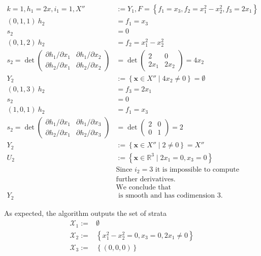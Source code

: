 \documentclass[
]{book}
\theoremstyle{definition}
\theoremstyle{definition}
\theoremstyle{definition}
\theoremstyle{definition}
\theoremstyle{remark}
\begin{document}
\begin{align}
k=1,h_{1}=2x,i_{1}=1,X''&:=Y_{1},F=\left\{ f_{1}=x_{3},f_{2}=x_{1}^{2}-x_{2}^{2},f_{3}=2x_{1}\right\} \\\left(0,1,1\right)\ h_{2}&=f_{1}=x_{3}\\s_{2}&=0\\\left(0,1,2\right)\ h_{2}&=f_{2}=x_{1}^{2}-x_{2}^{2}\\s_{2}=\det\begin{pmatrix}\partial h_{1}/\partial x_{1} & \partial h_{1}/\partial x_{2}\\
\partial h_{2}/\partial x_{1} & \partial h_{2}/\partial x_{2}
\end{pmatrix}&=\det\begin{pmatrix}2 & 0\\
2x_{1} & 2x_{2}
\end{pmatrix}=4x_{2}\\Y_{2}&:=\left\{ \mathbf{x}\in X''\mid4x_{2}\ne0\right\} =\emptyset\\\left(0,1,3\right)\ h_{2}&=f_{3}=2x_{1}\\s_{2}&=0\\\left(1,0,1\right)\ h_{2}&=f_{1}=x_{3}\\s_{2}=\det\begin{pmatrix}\partial h_{1}/\partial x_{1} & \partial h_{1}/\partial x_{3}\\
\partial h_{2}/\partial x_{1} & \partial h_{2}/\partial x_{3}
\end{pmatrix}&=\det\begin{pmatrix}2 & 0\\
0 & 1
\end{pmatrix}=2\\Y_{2}&:=\left\{ \mathbf{x}\in X''\mid2\ne0\right\} =X''\\U_{2}&:=\left\{ \mathbf{x}\in\mathbb{R}^{3}\mid2x_{1}=0,x_{3}=0\right\} \\&\text{Since }i_{2}=3\text{ it is impossible to compute}\\ & \text{further derivatives.}\\&\text{We conclude that}\\Y_{2}&\text{ is smooth and has codimension }3.
\end{align}

As expected, the algorithm outputs the set of strata
\begin{align*}
\mathcal{X}_{1}:=&\emptyset\\\mathcal{X}_{2}:=&\left\{ x_{1}^{2} - x_{2}^{2}=0,x_{3}=0,2x_{1}\ne0\right\} \\\mathcal{X}_{3}:=&\left\{ (0,0,0)\right\}
\end{align*}
\end{document}
